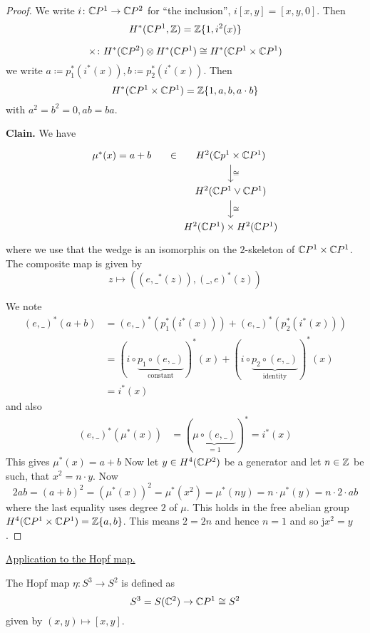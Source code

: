\documentclass[language=english]{TemplateLecture}
\begin{document}
\begin{proof}
    We write \(i \colon \mathbb{C} P ^1 \to \mathbb{C} P ^2\) for \enquote{the inclusion}, \(i[x,y] = [x,y,0]\). Then
    \[H^*(\mathbb{C} P^1, \mathbb{Z}) = \mathbb{Z}\{1, i^2(x)\}\]

    \[\times\colon H^*(\mathbb{C} P^2) \otimes H^*(\mathbb{C} P^1) \cong H^*(\mathbb{C} P^1\times \mathbb{C} P^1)\]
    we write \(a \coloneq p_1^*(i^*(x)), b \coloneq p_2^*(i^*(x))\). Then
    \[H^*(\mathbb{C} P^1 \times \mathbb{C} P^1) = \mathbb{Z}\{1,a,b,a\cdot b\}\]
    with \(a^2 = b^2 = 0, ab = ba\).

    \textbf{Clain.} We have
    \[\begin{tikzcd}
        \mu^*(x) = a+b \ar[r, phantom, "\in"] &  H^2(\IC p^1 \times \IC P^1) \ar[d, "\cong"] \\
        & H^2(\IC P^1 \vee \IC P^1) \ar[d, "\cong"] \\
        & H^2(\IC P^1) \times H^2(\IC P^1)
    \end{tikzcd}\]
    where we use that the wedge is an isomorphis on the \(2\)-skeleton of \(\mathbb{C} P^1 \times \mathbb{C} P^1\). The composite map is given by
    \[z \mapsto ((e, \_^*(z)), (\_, e)^*(z))\]

    We note
    \[\begin{split} 
        (e,\_)^*(a+b) &= (e, \_)^*(p_1^*(i^*(x))) + (e, \_)^*(p_2^*(i^*(x))) \\
        &= (i \circ \underbrace{p_1 \circ(e, \_)}_{\text{constant}})^*(x) + (i \circ \underbrace{p_2 \circ (e, \_)}_{\text{identity}})^*(x) \\
        &=  i^*(x)
    \end{split}\]
    and also
    \[\begin{split}
        (e, \_)^*(\mu^*(x)) &= (\underbrace{\mu \circ (e, \_)}_{= 1})^* = i^*(x)
    \end{split}\]
    This gives \(\mu^*(x) = a+b\)
    Now let \(y\in H^4(\mathbb{C} P^2)\) be a generator and let \(n \in \mathbb{Z}\) be such, that \(x^2 = n\cdot y\). Now
    \[2ab = (a+b)^2 = (\mu^*(x))^2 = \mu^*(x^2) = \mu^*(ny) = n \cdot \mu^*(y) = n\cdot 2 \cdot ab\]
    where the last equality uses degree \(2\) of \(\mu\). This holds in the free abelian group \(H^4(\mathbb{C} P^1 \times \mathbb{C} P^1) = \mathbb{Z}\{a,b\}\). This means \(2 = 2n\) and hence \(n = 1\) and so j\(x^2 = y\).
\end{proof}

\underline{Application to the Hopf map.}

The Hopf map \(\eta \colon S^3 \to S^2\) is defined as
\[S^3 = S(\mathbb{C}^2) \to \mathbb{C} P^1 \cong S^2\]
given by \((x,y) \mapsto [x,y]\).
\end{document}
